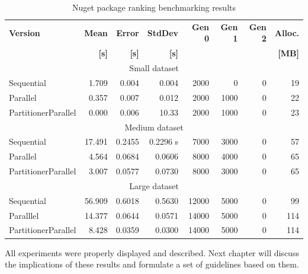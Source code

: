 \begin{table}[ht]\small
    \centering
    \caption{Nuget package ranking benchmarking results}
		\label{tab:NugetBenchmarking}
    \begin{tabularx}{\linewidth}{Xrrrrrrr} 
		  \toprule
			\toprule
			\bfseries Version 		&
			\bfseries Mean 	      &
			\bfseries Error       &
			\bfseries StdDev 	    &
			\bfseries Gen 0	    	&
			\bfseries Gen 1	    	&
			\bfseries Gen 2	    	&
			\bfseries Alloc.      \\ 
			&
			\bfseries {[}s{]} &
			\bfseries {[}s{]} &
			\bfseries {[}s{]} &
			&
			&
			&
			\bfseries{[}MB{]} \\			
			\midrule 
			\multicolumn{8}{c}{Small dataset} \\ 
			\midrule
			Sequential & 1.709 	& 0.004 	& 0.004 	& 2000 & 0 &    0 &	19  \\
			Parallel & 0.357 	& 0.007 	 & 0.012 	& 2000 & 1000 &	0 &	22  \\
			PartitionerParallel & 0.000  & 0.006 	& 10.33 	& 2000 & 1000 &	0 &	23  \\
			\midrule
			\multicolumn{8}{c}{Medium dataset} \\ 
			\midrule
			Sequential & 17.491    &  0.2455&	0.2296 s& 7000 & 3000 &	0 &	57  \\
			Parallel & 4.564     & 0.0684 &0.0606& 8000 & 4000 &	0 &	65 \\
			PartitionerParallel & 3.007     & 0.0577 &0.0730& 8000 & 3000 &	0 &	65  \\
			\midrule
            \multicolumn{8}{c}{Large dataset} \\ 
			\midrule
			Sequential    &      56.909&	0.6018&	0.5630&	12000 & 	5000 &	0	& 99   \\
			Paralllel     &      14.377&	0.0644&	0.0571&	14000 &	5000	 &0	& 114  \\
			PartitionerParallel &  8.428 &	0.0359&	0.0300&	14000 &	5000 &0	& 114  \\
			\bottomrule
    \end{tabularx}
\end{table}

All experiments were properly displayed and described. Next chapter will 
discuss the implications of these results and formulate a set of guidelines 
based on them. 



